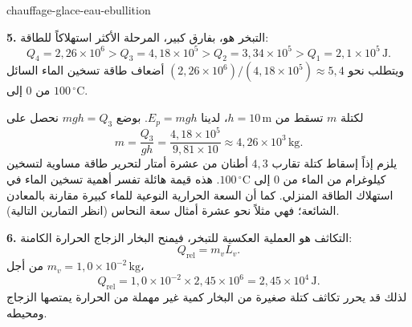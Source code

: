 \begin{exo}{chauffage-glace-eau-ebullition}
\begin{solution}
\textbf{5.} التبخر هو، بفارق كبير، المرحلة الأكثر استهلاكاً للطاقة:
\[
Q_4=2{,}26\times10^6>Q_3=4{,}18\times10^5>Q_2=3{,}34\times10^5>Q_1=2{,}1\times10^5\,\text{J}.
\]
ويتطلب نحو $(2{,}26\times10^6)/(4{,}18\times10^5)\approx5{,}4$ أضعاف طاقة تسخين الماء السائل من $0$ إلى $100\,{}^\circ\text{C}$.

لكتلة $m$ تسقط من $h=10\,\text{m}$، لدينا $E_p=mgh$. بوضع $mgh=Q_3$ نحصل على
\[
m=\frac{Q_3}{gh}=\frac{4{,}18\times10^5}{9{,}81\times10}
\approx4{,}26\times10^3\,\text{kg}.
\]
يلزم إذاً إسقاط كتلة تقارب $4{,}3$ أطنان من عشرة أمتار لتحرير طاقة مساوية لتسخين كيلوغرام من الماء من $0$ إلى $100\,{}^\circ\text{C}$. هذه قيمة هائلة تفسر أهمية تسخين الماء في استهلاك الطاقة المنزلي. كما أن السعة الحرارية النوعية للماء كبيرة مقارنة بالمعادن الشائعة؛ فهي مثلاً نحو عشرة أمثال سعة النحاس (انظر التمارين التالية).

\textbf{6.} التكاثف هو العملية العكسية للتبخر، فيمنح البخار الزجاج الحرارة الكامنة:
\[
Q_{\text{rel}}=m_vL_v.
\]
من أجل $m_v=1{,}0\times10^{-2}\,\text{kg}$،
\[
Q_{\text{rel}}=1{,}0\times10^{-2}\times2{,}45\times10^6
=2{,}45\times10^4\,\text{J}.
\]
لذلك قد يحرر تكاثف كتلة صغيرة من البخار كمية غير مهملة من الحرارة يمتصها الزجاج ومحيطه.
\end{solution}
\end{exo}

